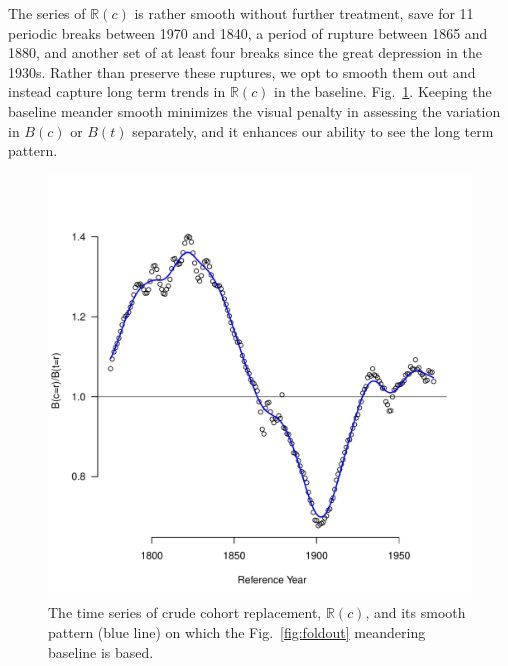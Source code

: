 \documentclass{article}
\begin{document}
The series of $\mathbb{R}(c)$ is rather smooth without further treatment, save for 11 periodic breaks between 1970 and 1840, a period of rupture between 1865 and 1880, and another set of at least four breaks since the great depression in the 1930s. Rather than preserve these ruptures, we opt to smooth them out and instead capture long term trends in $\mathbb{R}(c)$ in the baseline. Fig.~\ref{fig:meander}. Keeping the baseline meander smooth minimizes the visual penalty in assessing the variation in $B(c)$ or $B(t)$ separately, and it enhances our ability to see the long term pattern.

\begin{figure}[ht!]
\centering
 \includegraphics[scale=.6]{Figures/Meander.pdf}
\caption{The time series of crude cohort replacement, $\mathbb{R}(c)$, and its smooth pattern (blue line) on which the Fig.~\ref{fig:foldout} meandering baseline is based.}
\label{fig:meander}
\end{figure}
\end{document}
